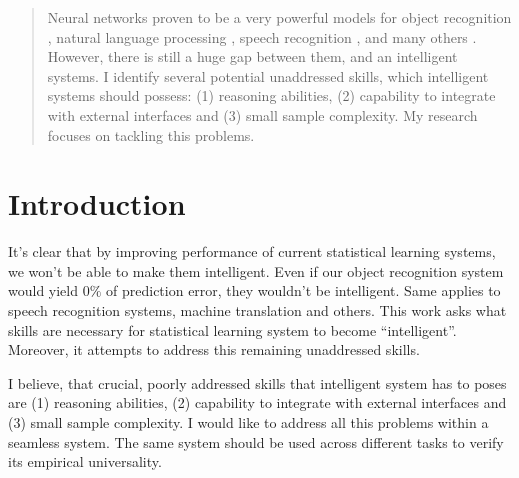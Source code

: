 \documentclass{article}
\begin{document}
 


\begin{abstract}

Neural networks proven to be a very powerful models for object recognition \cite{krizhevsky2012imagenet}, 
natural language processing \cite{mikolov2012statistical}, speech recognition \cite{graves2013speech}, and many others \cite{sutskever2014sequence}. 
However, there is still a huge gap between them, and an intelligent systems. 
I identify several potential unaddressed skills, which intelligent systems should possess: 
(1) reasoning abilities, (2) capability to integrate with external interfaces and (3) small sample complexity. My research focuses on tackling this problems. 

\end{abstract} 

\section{Introduction}
It's clear that by improving performance of current statistical learning systems, 
we won't be able to make them intelligent. Even if our object recognition system would yield
$0\%$ of prediction error, they wouldn't be intelligent. Same applies to speech 
recognition systems, machine translation and others. This work asks what skills are necessary for statistical
learning system to become ``intelligent''. Moreover, it attempts to address this remaining unaddressed skills. 


I believe, that crucial, poorly addressed skills that intelligent system has to poses are
(1) reasoning abilities, (2) capability to integrate with external interfaces and (3) small sample complexity. 
I would like to address all this problems within a seamless system. The same system should be used across
different tasks to verify its empirical universality.
\end{document}
